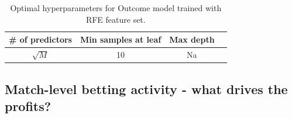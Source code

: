 \begin{table}
    \caption{Optimal hyperparameters for Outcome model trained with RFE feature set.}
    \begin{tabular}{| c | c| c| c|}
        \hline
         \# of predictors & Min samples at leaf & Max depth\\
        \hline
         $\sqrt{M}$ & 10 & Na \\
        \hline
    \end{tabular}
    \label{table:hyperparam_results_rfe}
\end{table}


\subsection{Match-level betting activity - what drives the profits?}

